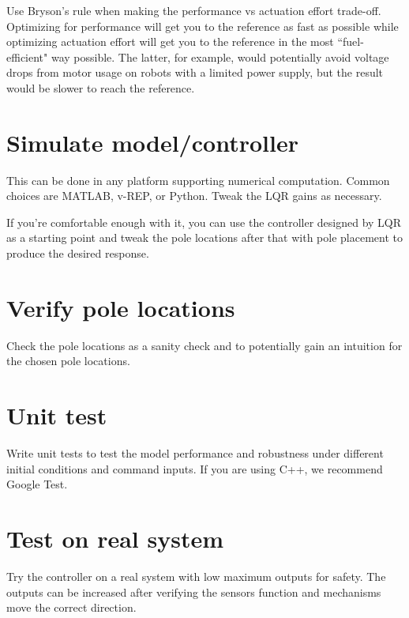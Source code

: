 Use Bryson's rule when making the performance vs actuation effort trade-off.
Optimizing for performance will get you to the reference as fast as possible
while optimizing actuation effort will get you to the reference in the most
``fuel-efficient" way possible. The latter, for example, would potentially avoid
voltage drops from motor usage on robots with a limited power supply, but the
result would be slower to reach the reference.

\section{Simulate model/controller}

This can be done in any platform supporting numerical computation. Common
choices are MATLAB, v-REP, or Python. Tweak the LQR gains as necessary.

If you're comfortable enough with it, you can use the controller designed by LQR
as a starting point and tweak the pole locations after that with pole placement
to produce the desired response.

\section{Verify pole locations}

Check the pole locations as a sanity check and to potentially gain an intuition
for the chosen pole locations.

\section{Unit test}

Write unit tests to test the \gls{model} performance and \gls{robustness} under
different initial conditions and command inputs. If you are using C++, we
recommend Google Test.

\section{Test on real system}

Try the controller on a real \gls{system} with low maximum outputs for safety.
The outputs can be increased after verifying the sensors function and mechanisms
move the correct direction.
